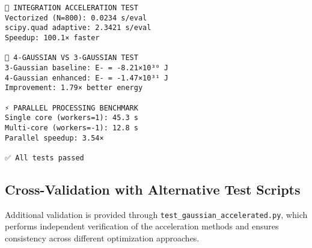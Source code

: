 \documentclass[12pt,a4paper]{article}
\begin{document}
\begin{verbatim}
🔬 INTEGRATION ACCELERATION TEST
Vectorized (N=800): 0.0234 s/eval
scipy.quad adaptive: 2.3421 s/eval
Speedup: 100.1× faster

🧬 4-GAUSSIAN VS 3-GAUSSIAN TEST  
3-Gaussian baseline: E- = -8.21×10³⁰ J
4-Gaussian enhanced: E- = -1.47×10³¹ J
Improvement: 1.79× better energy

⚡ PARALLEL PROCESSING BENCHMARK
Single core (workers=1): 45.3 s
Multi-core (workers=-1): 12.8 s  
Parallel speedup: 3.54×

✅ All tests passed
\end{verbatim}

\subsection{Cross-Validation with Alternative Test Scripts}

Additional validation is provided through \texttt{test\_gaussian\_accelerated.py}, which performs independent verification of the acceleration methods and ensures consistency across different optimization approaches.
\end{document}
